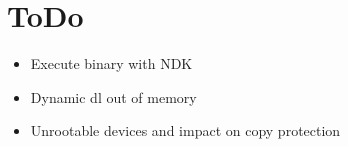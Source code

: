 \chapter{ToDo}

\begin{itemize}
\item Execute binary with NDK
\item Dynamic dl out of memory
\item Unrootable devices and impact on copy protection
\end{itemize}